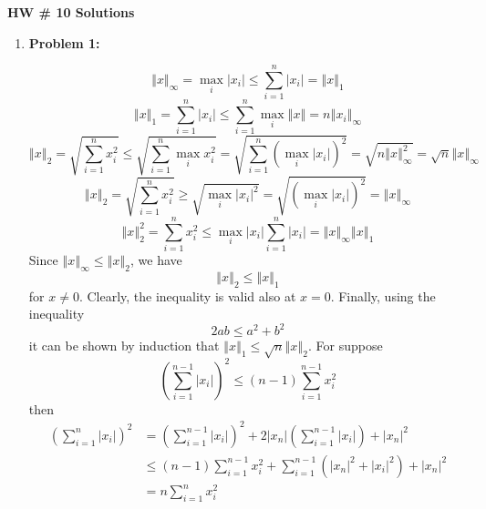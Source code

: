 \documentclass[letterpaper]{article}
\begin{document}
\newcommand{\trace}{\mathrm{trace}}
\newcommand{\real}{\mathbb R}  %
\newcommand{\nat}{\mathbb R}   %
\newcommand{\cp}{\mathbb C}    %
\newcommand{\ds}{\displaystyle}
\newcommand{\mf}[2]{\frac{\ds #1}{\ds #2}}
\newcommand{\book}[2]{{Luenberger, Page~#1, }{Prob.~#2}}
\newcommand{\spanof}[1]{\textrm{span} \{ #1 \}}
\parindent 0pt


\begin{center}
{\large \bf HW \# 10 Solutions}
\end{center}

\vspace*{1cm}

\begin{enumerate}
\item \noindent \textbf{Problem 1:}

$$\left\Vert x\right\Vert _{\infty} = \max\limits_{i}|x_{i}| \le \sum_{i=1}^{n}|x_{i}|=\left\Vert x\right\Vert _{1}$$
$$\left\Vert x\right\Vert _{1}=\sum_{i=1}^{n}|x_{i}| \le \sum_{i=1}^{n} \max\limits_{i}\left\Vert x\right\Vert = n \left\Vert x_{i}\right\Vert _{\infty}$$
$$\left\Vert x\right\Vert _{2}=\sqrt{\sum_{i=1}^{n}x_{i}^2} \le \sqrt{\sum_{i=1}^{n} \max\limits_{i} x_{i}^2} = \sqrt{\sum_{i=1}^{n} \left(\max\limits_{i} |x_{i}|\right)^2} = \sqrt{n\left\Vert x\right\Vert _{\infty}^2} = \sqrt{n}\left\Vert x\right\Vert _{\infty} $$
$$\left\Vert x\right\Vert _{2}=\sqrt{\sum_{i=1}^{n}x_{i}^2} \ge \sqrt{ \max\limits_{i} |x_{i}|^2} = \sqrt{ \left(\max\limits_{i} |x_{i}|\right)^2} = \left\Vert x\right\Vert _{\infty} $$
$$\left\Vert x\right\Vert _{2}^2 =\sum_{i=1}^{n}x_{i}^2 \le \max\limits_{i} |x_{i}| \sum_{i=1}^{n}|x_{i}|=\left\Vert x\right\Vert _{\infty}\left\Vert x\right\Vert _{1}$$
Since $\left\Vert x\right\Vert _{\infty} \le \left\Vert x\right\Vert _{2}$, we have $$\left\Vert x\right\Vert _{2} \le \left\Vert x\right\Vert _{1}$$
for $x\not=0$. Clearly, the inequality is valid also at $x=0$. Finally, using the inequality
$$2ab \le a^2 + b^2$$
it can be shown by induction that $\left\Vert x\right\Vert_{1} \le \sqrt{n}\left\Vert x\right\Vert_{2}$. For suppose
$$ \left(\sum_{i=1}^{n-1}|x_{i}|\right)^2 \le (n-1)\sum_{i=1}^{n-1} x_{i}^{2}$$
then
$$\begin{aligned}
\left(\sum_{i=1}^{n}|x_{i}|\right)^2 &= \left(\sum_{i=1}^{n-1}|x_{i}|\right)^2 + 2|x_{n}|\left(\sum_{i=1}^{n-1}|x_{i}|\right) + |x_{n}|^2 \\
&\le (n-1)\sum_{i=1}^{n-1}x_{i}^{2}+\sum_{i=1}^{n-1}(|x_{n}|^2 + |x_{i}|^2) + |x_{n}|^2 \\
&=n\sum_{i=1}^{n}x_{i}^{2}
\end{aligned}$$
\\


\end{enumerate}
\end{document}
